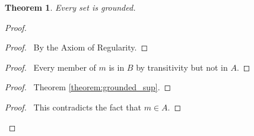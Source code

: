 \documentclass{article}
\let\qed\relax
\newtheorem{theorem}[axiom]{Theorem}
\theoremstyle{definition}
\begin{document}
    \begin{theorem}
        Every set is grounded.
    \end{theorem}
    
    \begin{proof}
        \pf
            \begin{proof}
                \pf\ By the Axiom of Regularity.
            \end{proof}
            \begin{proof}
                \pf\ Every member of $m$ is in $B$ by transitivity but not in $A$.
            \end{proof}
            \begin{proof}
                \pf\ Theorem \ref{theorem:grounded_sup}.
            \end{proof}
            \qedstep
            \begin{proof}
                \pf\ This contradicts the fact that $m \in A$.
            \end{proof}
        \qed
    \end{proof}
\end{document}
